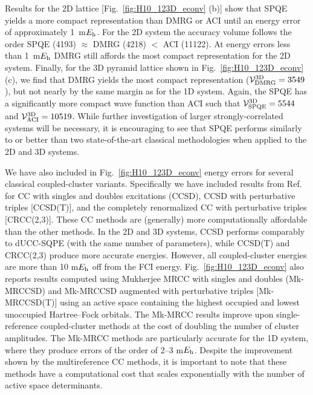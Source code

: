 \documentclass[aps,prx, reprint]{revtex4-2}
\newcommand*{\Eh}{$E_{\rm h}$\xspace}
\begin{document}
Results for the 2D  lattice [Fig.~\ref{fig:H10_123D_econv} (b)]  show that SPQE yields a more compact representation than DMRG or ACI until an energy error of approximately 1~m\Eh.
For the 2D system the accuracy volume follows the order SPQE (4193) $\approx$ DMRG (4218) $<$ ACI (11122).
At energy errors less than 1~m\Eh DMRG still affords the most compact representation for the 2D system.
Finally, for the 3D  pyramid lattice shown in Fig.~\ref{fig:H10_123D_econv} (c), we find that DMRG yields the most compact representation ($\mathcal{V}_{\rm{DMRG}}^{\rm{3D}} = 3549$), but not nearly by the same margin as for the 1D system.
Again, the SPQE has a significantly more compact wave function than ACI such that $\mathcal{V}_{\rm{SPQE}}^{\rm{3D}} = 5544$ and $\mathcal{V}_{\rm{ACI}}^{\rm{3D}} = 10 519$.
While further investigation of larger strongly-correlated systems will be necessary, it is encouraging to see that SPQE performs similarly to or better than two state-of-the-art classical methodologies when applied to the 2D and 3D  systems.

We have also included in Fig.~\ref{fig:H10_123D_econv} energy errors for several classical coupled-cluster variants.
Specifically we have included results from Ref.~\cite{stair2020exploring} for CC with singles and doubles excitations \cite{Purvis1982FullCoupled} (CCSD), CCSD with perturbative triples \cite{Raghavachari1989AFifth} [CCSD(T)], and the completely renormalized CC with perturbative triples \cite{piecuch2005renormalized} [CRCC(2,3)].
These CC methods are (generally) more computationally affordable than the other methods. In the 2D and 3D systems, CCSD performs comparably to dUCC-SQPE (with the same number of parameters), while CCSD(T) and CRCC(2,3) produce more accurate energies. However, all coupled-cluster energies are more than 10 m\Eh off from the FCI energy.
Fig.~\ref{fig:H10_123D_econv} also reports results computed using Mukherjee MRCC with singles and doubles \cite{Mahapatra:1999tm,Evangelista:2007hz} (Mk-MRCCSD)  and Mk-MRCCSD augmented with perturbative triples \cite{Evangelista:2010cq} [Mk-MRCCSD(T)] using an active space containing the highest occupied and lowest unoccupied Hartree--Fock orbitals.
The Mk-MRCC results improve upon single-reference coupled-cluster methods at the cost of doubling the number of cluster amplitudes. The Mk-MRCC methods are particularly accurate for the 1D system, where they produce errors of the order of 2--3 m\Eh.
Despite the improvement shown by the multireference CC methods, it is important to note that these methods have a computational cost that scales exponentially with the number of active space determinants.
\end{document}
